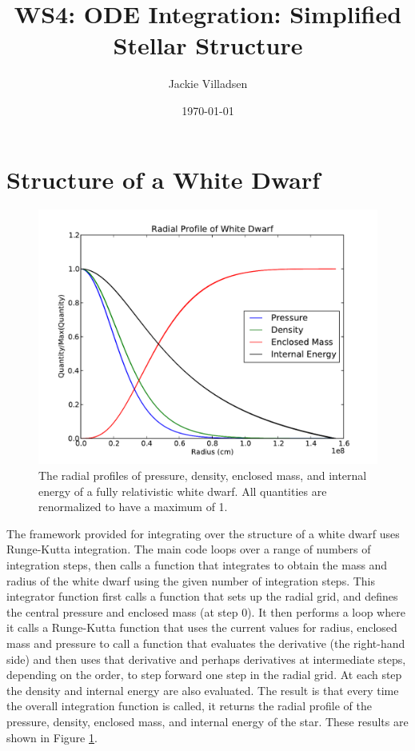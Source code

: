 \documentclass{article}
\begin{document}
\title{WS4: ODE Integration: Simplified Stellar Structure}
\author{Jackie Villadsen}
\date{\today}
\maketitle


\section{Structure of a White Dwarf}

\begin{figure}[h]
  \begin{center}
     \includegraphics[width=\textwidth]{radial}
  \end{center}
  \caption{The radial profiles of pressure, density, enclosed mass, and internal energy of a fully
relativistic white dwarf.  All quantities are renormalized to have a maximum of 1.}
  \label{fig:radial}
\end{figure}

The framework provided for integrating over the structure of a white dwarf uses Runge-Kutta integration.
The main code loops over a range of numbers of integration steps, then calls a function that 
integrates to obtain the mass and radius of the white dwarf using the given number of integration steps.
This integrator function first calls a function that sets up the radial grid, and defines the central pressure
and enclosed mass (at step 0).  It then performs a loop where it calls a Runge-Kutta function that uses
the current values for radius, enclosed mass and pressure to call a function that evaluates the derivative (the
right-hand side) and then uses that derivative and perhaps derivatives at intermediate steps, depending on the order,
to step forward one step in the radial grid.  At each step the density and internal energy are also evaluated.
The result is that every time the overall integration function is called,
it returns the radial profile of the pressure, density, enclosed mass, and internal energy of the star.  These
results are shown in Figure \ref{fig:radial}.
\end{document}
